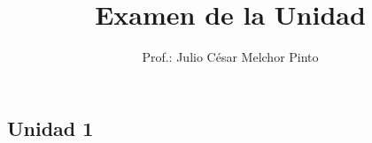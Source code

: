 \documentclass[12pt,addpoints]{evalua}
\title{Examen de la Unidad}
\author{Prof.: Julio César Melchor Pinto}
\begin{document}
\tableofcontents
\newpage%
\begin{questions}
   \section*{Unidad 1}
    \question[10] 

\end{questions}
\end{document}
